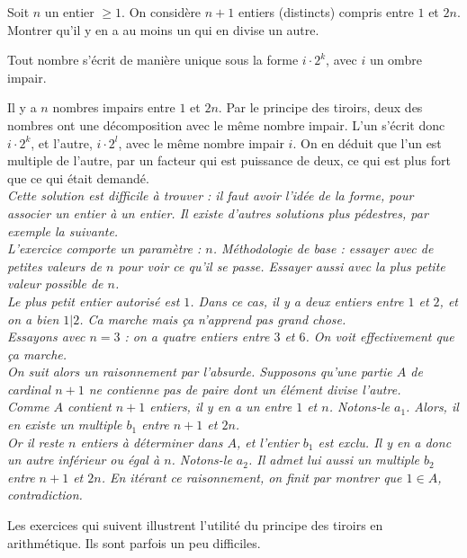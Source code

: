 \begin{exo}[Diviseurs]
Soit $n$ un entier $\geq 1$. On considère $n+1$ entiers (distincts) compris entre $1$ et $2n$. Montrer qu'il y en a au moins un qui en  divise un autre.
\begin{sol}

Tout nombre s'écrit de manière unique sous la forme $i \cdot 2^k$, avec $i$ un ombre impair.

Il y a $n$ nombres impairs entre $1$ et $2n$. Par le principe des tiroirs, deux des nombres ont une décomposition avec le même nombre impair. L'un s'écrit donc $i\cdot 2^k$, et l'autre, $i\cdot 2^l$, avec le même nombre impair $i$. On en déduit que l'un est multiple de l'autre, par un facteur qui est puissance de deux, ce qui est plus fort que ce qui était demandé.\\

\emph{Cette solution est difficile à trouver : il faut avoir l'idée de la forme, pour associer un entier à un entier. Il existe d'autres solutions plus pédestres, par exemple la suivante.\\
L'exercice comporte un paramètre : $n$. Méthodologie de base : essayer avec de petites valeurs de $n$ pour voir ce qu'il se passe.  Essayer aussi avec la plus petite valeur possible de $n$.\\
Le plus petit entier autorisé est $1$. Dans ce cas, il y a deux entiers entre $1$ et $2$, et on a bien $1|2$. Ca marche mais ça n'apprend pas grand chose.\\
Essayons avec $n=3$ : on a quatre entiers entre $3$ et $6$. On voit effectivement que ça marche.\\
On suit alors un raisonnement par l'absurde. Supposons qu'une partie $A$ de cardinal $n+1$ ne contienne pas de paire dont un élément divise l'autre.\\
Comme $A$ contient  $n+1$ entiers, il y en a un entre $1$ et $n$. Notons-le $a_1$. Alors, il en existe un multiple $b_1$ entre $n+1$ et $2n$.\\
Or il reste $n$ entiers à déterminer dans $A$, et l'entier $b_1$ est exclu. Il y en a donc un autre inférieur ou égal à $n$. Notons-le $a_2$. Il admet lui aussi un multiple $b_2$ entre $n+1$ et $2n$. En itérant ce raisonnement, on finit par montrer que $1\in A$, contradiction.}
\end{sol}
\end{exo}



\etoile

Les exercices qui suivent illustrent l'utilité du principe des tiroirs en arithmétique. Ils sont parfois un peu difficiles.

